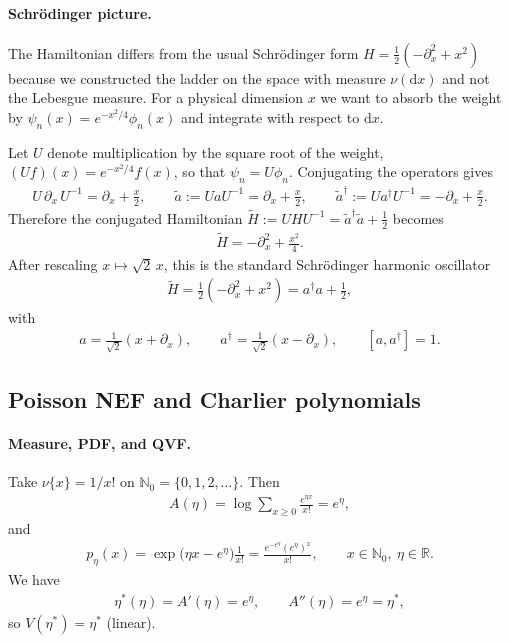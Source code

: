 \documentclass[a4paper,11pt]{article}
\numberwithin{equation}{section}
\theoremstyle{plain}
\theoremstyle{definition}
\theoremstyle{remark}
\newcommand{\R}{\ensuremath{\mathbb{R}}\xspace}
\newcommand{\1}{\ensuremath{\mathds{1}}\xspace}
\newcommand{\dd}{\ensuremath{{\textrm{d}}}\xspace}
\begin{document}
\paragraph{Schr\"odinger picture.}
The Hamiltonian differs from the usual Schr\"odinger form $H=\frac{1}{2}(-\partial_x^2+x^2)$ because we constructed the ladder on the space with measure $\nu(\dd x)$ and not the Lebesgue measure. For a physical dimension $x$ we want to absorb the weight by $\psi_n(x)=e^{-x^2/4}\phi_n(x)$ and integrate with respect to $\dd x$.

Let $U$ denote multiplication by the square root of the weight, $(U f)(x)=e^{-x^2/4}f(x)$, so that $\psi_n=U\phi_n$.
Conjugating the operators gives
\begin{align}
    U\,\partial_x\,U^{-1}=\partial_x+\frac{x}{2},\qquad
    \tilde a:=U a U^{-1}=\partial_x+\frac{x}{2},\qquad
    \tilde a^\dagger:=U a^\dagger U^{-1}=-\partial_x+\frac{x}{2}.
\end{align}
Therefore the conjugated Hamiltonian $\tilde H:=U H U^{-1}=\tilde a^\dagger \tilde a+\frac{1}{2}$ becomes
\begin{align}
    \tilde H=-\partial_x^2+\frac{x^2}{4}.
\end{align}
After rescaling $x\mapsto \sqrt{2}\,x$, this is the standard Schr\"odinger harmonic oscillator
\begin{align}
    \tilde H=\frac{1}{2}\left(-\partial_x^2+x^2\right)
    = a^\dagger a+\frac{1}{2},
\end{align}
with
\begin{align}
    a=\frac{1}{\sqrt{2}}\left(x+\partial_x\right),
    \qquad
    a^\dagger=\frac{1}{\sqrt{2}}\left(x-\partial_x\right),
    \qquad
    [a,a^\dagger]=1.
\end{align}

\subsection{Poisson NEF and Charlier polynomials}
\paragraph{Measure, PDF, and QVF.} 
Take $\nu\{x\}=1/x!$ on $\mathbb{N}_0=\{0,1,2,\dots\}$. Then
\begin{align}
A(\eta)=\log\sum_{x\ge 0}\frac{e^{\eta x}}{x!}=e^\eta,
\end{align}
and
\begin{align}
p_\eta(x)=\exp\!\big(\eta x-e^\eta\big)\frac{1}{x!}
=\frac{e^{-e^\eta}(e^\eta)^x}{x!},\qquad x\in\mathbb{N}_0,\ \eta\in\R.
\end{align}
We have 
\begin{align}
\eta^\ast(\eta)=A'(\eta)=e^\eta,\qquad A''(\eta)=e^\eta=\eta^\ast,
\end{align}
so $V(\eta^\ast)=\eta^\ast$ (linear). 
\end{document}

